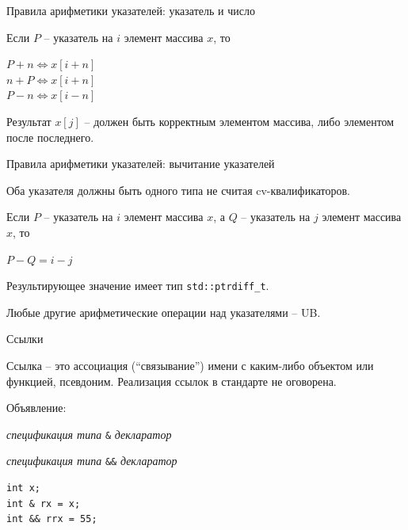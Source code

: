 \documentclass[unknownkeysallowed,xcolor=table]{beamer}
\begin{document}
\begin{frame}[fragile]{Правила арифметики указателей: указатель и число}

Если $P$ -- указатель на $i$ элемент массива $x$, то

\vspace{0.5em}

$P + n \Leftrightarrow x[i + n]$ \\ \vspace{0.5em}
$n + P \Leftrightarrow x[i + n]$ \\ \vspace{0.5em}
$P - n \Leftrightarrow x[i-n]$

\vspace{1em}

Результат $x[j]$ -- должен быть корректным элементом массива, либо элементом после последнего.

\end{frame}

\begin{frame}[fragile]{Правила арифметики указателей: вычитание указателей}

Оба указателя должны быть одного типа не считая cv-квалификаторов.

\vspace{1em}

Если $P$ -- указатель на $i$ элемент массива $x$, а $Q$ -- указатель на $j$ элемент массива $x$, то

\vspace{1em}

$P - Q = i - j$

\vspace{1em}

Результирующее значение имеет тип \lstinline{std::ptrdiff_t}.

\vspace{2em}

Любые другие арифметические операции над указателями -- UB.

\end{frame}

\begin{frame}[fragile]{Ссылки}

Ссылка -- это ассоциация (``связывание'') имени с каким-либо объектом или функцией, псевдоним.
Реализация ссылок в стандарте не оговорена.

\vspace{2em}

Объявление:

\vspace{0.7em}

\emph{спецификация типа} \lstinline{&} \emph{декларатор}

\vspace{0.5em}

\emph{спецификация типа} \lstinline{&&} \emph{декларатор}

\vspace{1em}

\begin{lstlisting}
int x;
int & rx = x;
int && rrx = 55;
\end{lstlisting}

\end{frame}
\end{document}
